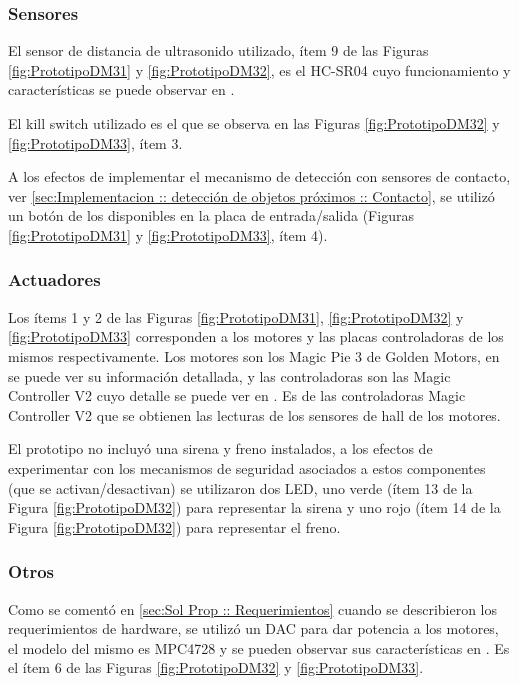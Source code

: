 \documentclass[withindex,glossary]{cam-thesis}
\begin{document}
\subsubsection{Sensores} \label{sec: Plataforma :: Sensores}
El sensor de distancia de ultrasonido utilizado, ítem 9 de las Figuras \ref{fig:PrototipoDM31} y \ref{fig:PrototipoDM32}, es el HC-SR04 cuyo funcionamiento y características se puede observar en \cite{HCSR04}.

El kill switch utilizado es el que se observa en las Figuras \ref{fig:PrototipoDM32} y \ref{fig:PrototipoDM33}, ítem 3.

A los efectos de implementar el mecanismo de detección con sensores de contacto, ver \ref{sec:Implementacion :: detección de objetos próximos :: Contacto}, se utilizó un botón de los disponibles en la placa de entrada/salida (Figuras \ref{fig:PrototipoDM31} y \ref{fig:PrototipoDM33}, ítem 4).

\subsubsection{Actuadores} \label{sec: Implementación :: Plataforma Utilizada - Hardware - Actuadores}
Los ítems 1 y 2 de las Figuras \ref{fig:PrototipoDM31}, \ref{fig:PrototipoDM32} y \ref{fig:PrototipoDM33} corresponden a los motores y las placas controladoras de los mismos respectivamente. Los motores son los Magic Pie 3 de Golden Motors, en \cite{MagicPie3} se puede ver su información detallada, y las controladoras son las Magic Controller V2 cuyo detalle se puede ver en \cite{MagicControllerV2}. Es de las controladoras Magic Controller V2 que se obtienen las lecturas de los sensores de hall de los motores.

El prototipo no incluyó una sirena y freno instalados, a los efectos de experimentar con los mecanismos de seguridad asociados a estos componentes (que se activan/desactivan) se utilizaron dos LED, uno verde (ítem 13 de la Figura \ref{fig:PrototipoDM32}) para representar la sirena y uno rojo (ítem 14 de la Figura \ref{fig:PrototipoDM32}) para representar el freno.

\subsubsection{Otros} \label{sec: Implementación :: Plataforma Utilizada - Hardware - Otros}
Como se comentó en \ref{sec:Sol Prop :: Requerimientos} cuando se describieron los requerimientos de hardware, se utilizó un DAC para dar potencia a los motores, el modelo del mismo es MPC4728 y se pueden observar sus características en \cite{MPC4728}. Es el ítem 6 de las Figuras \ref{fig:PrototipoDM32} y \ref{fig:PrototipoDM33}.
\end{document}
